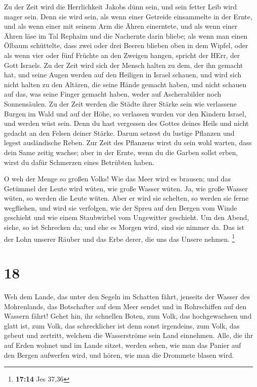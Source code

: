  Zu der Zeit wird die Herrlichkeit Jakobs dünn sein, und
sein fetter Leib wird mager sein.  Denn sie wird sein, als
wenn einer Getreide einsammelte in der Ernte, und als wenn einer mit
seinem Arm die Ähren einerntete, und als wenn einer Ähren läse im Tal
Rephaim  und die Nachernte darin bliebe; als wenn man einen
Ölbaum schüttelte, dass zwei oder drei Beeren blieben oben in dem
Wipfel, oder als wenn vier oder fünf Früchte an den Zweigen hangen,
spricht der HErr, der Gott Israels.  Zu der Zeit wird sich
der Mensch halten zu dem, der ihn gemacht hat, und seine Augen werden
auf den Heiligen in Israel schauen,  und wird sich nicht
halten zu den Altären, die seine Hände gemacht haben, und nicht schauen
auf das, was seine Finger gemacht haben, weder auf Ascherabilder noch
Sonnensäulen.  Zu der Zeit werden die Städte ihrer Stärke
sein wie verlassene Burgen im Wald und auf der Höhe, so verlassen wurden
vor den Kindern Israel, und werden wüst sein.  Denn du hast
vergessen des Gottes deines Heils und nicht gedacht an den Felsen deiner
Stärke. Darum setzest du lustige Pflanzen und legest ausländische Reben.
 Zur Zeit des Pflanzens wirst du sein wohl warten, dass
dein Same zeitig wachse; aber in der Ernte, wenn du die Garben sollst
erben, wirst du dafür Schmerzen eines Betrübten haben.

 O weh der Menge so großen Volks! Wie das Meer wird es
brausen; und das Getümmel der Leute wird wüten, wie große Wasser wüten.
 Ja, wie große Wasser wüten, so werden die Leute wüten.
Aber er wird sie schelten, so werden sie ferne wegfliehen, und wird sie
verfolgen, wie der Spreu auf den Bergen vom Winde geschieht und wie
einem Staubwirbel vom Ungewitter geschieht.  Um den Abend,
siehe, so ist Schrecken da; und ehe es Morgen wird, sind sie nimmer da.
Das ist der Lohn unserer Räuber und das Erbe derer, die uns das Unsere
nehmen. \footnote{\textbf{17:14} Jes 37,36}

\hypertarget{section-9}{%
\section{18}\label{section-9}}

 Weh dem Lande, das unter den Segeln im Schatten fährt,
jenseits der Wasser des Mohrenlands,  das Botschafter auf
dem Meer sendet und in Rohrschiffen auf den Wassern fährt! Gehet hin,
ihr schnellen Boten, zum Volk, das hochgewachsen und glatt ist, zum
Volk, das schrecklicher ist denn sonst irgendeins, zum Volk, das gebeut
und zertritt, welchem die Wasserströme sein Land einnehmen. 
Alle, die ihr auf Erden wohnet und im Lande sitzet, werden sehen, wie
man das Panier auf den Bergen aufwerfen wird, und hören, wie man die
Drommete blasen wird.

